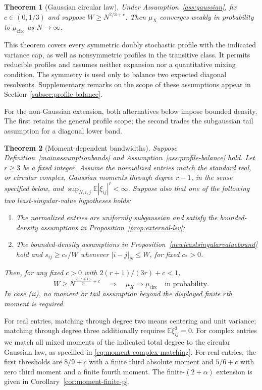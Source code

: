 \documentclass[11pt,reqno]{amsart}
\numberwithin{equation}{section}
\theoremstyle{plain}
\newtheorem{theorem}{Theorem}[section]
\theoremstyle{definition}
\theoremstyle{remark}
\begin{document}
\begin{theorem}[Gaussian circular law]\label{thm:circular-gaussian}
Under Assumption~\ref{ass:gaussian}, fix $c\in(0,1/3)$ and suppose
$W\geq N^{2/3+c}$. Then $\mu_X$ converges weakly in probability to
$\mu_{\mathrm{circ}}$ as $N\to\infty$.
\end{theorem}

This theorem covers every symmetric doubly stochastic profile with the
indicated variance cap, as well as nonsymmetric profiles in the transitive
class. It permits reducible profiles and assumes neither expansion nor a
quantitative mixing condition. The symmetry is used only to balance two
expected diagonal resolvents. Supplementary remarks on the scope of
these assumptions appear in Section~\ref{subsec:profile-balance}.


For the non-Gaussian extension, both alternatives below impose bounded
density. The first retains the general profile scope; the second trades
the subgaussian tail assumption for a diagonal lower band.

\begin{theorem}[Moment-dependent bandwidths]\label{thm:moment-main}
Suppose Definition~\ref{mainassumptionbands} and
Assumption~\ref{ass:profile-balance} hold. Let $r\geq3$ be a fixed integer.
Assume the normalized entries match the standard real, or circular complex,
Gaussian moments through degree $r-1$, in the sense specified below, and
$\sup_{N,i,j}\mathbb E|\xi_{ij}|^r<\infty$. Suppose also that one of
the following two least-singular-value hypotheses holds:
\begin{enumerate}[label=\textup{(\roman*)}]
\item The normalized entries are uniformly subgaussian and satisfy the
bounded-density assumptions in Proposition~\ref{prop:external-lsv};
\item The bounded-density assumptions in Proposition~\ref{newleastsingularvaluebound}
hold and $s_{ij}\geq c_*/W$ whenever $|i-j|_N\leq W$, for fixed $c_*>0$.
\end{enumerate}
Then, for any fixed $c>0$ with $2(r+1)/(3r)+c<1$,
\[
 W\geq N^{\frac{2(r+1)}{3r}+c}
 \quad\Longrightarrow\quad
 \mu_X\Longrightarrow\mu_{\mathrm{circ}}\quad\text{in probability}.
\]
In case \textup{(ii)}, no moment or tail assumption beyond the displayed
finite $r$th moment is required.
\end{theorem}


For real entries, matching through degree two means centering and unit
variance; matching through degree three additionally requires
$\mathbb E\xi_{ij}^3=0$. For complex entries we match all mixed moments
of the indicated total degree to the circular Gaussian law, as specified
in \eqref{eq:moment-complex-matching}.
For real entries, the first thresholds are $8/9+c$ with a finite third
absolute moment and $5/6+c$ with zero third moment and a finite fourth
moment. The finite-$(2+\alpha)$ extension is given in
Corollary~\ref{cor:moment-finite-p}.
\end{document}
